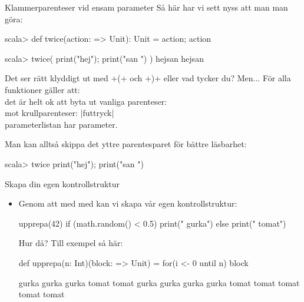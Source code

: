\begin{Slide}{Klammerparenteser vid ensam parameter}
Så här har vi sett nyss att man man göra:
\begin{REPL}
scala> def twice(action: => Unit): Unit = { action; action }

scala> twice( { print("hej"); print("san ") } )
hejsan hejsan
\end{REPL}

Det ser rätt klyddigt ut med \code+{(+  och \code+)}+ eller vad tycker du? \pause Men...
För alla funktioner  gäller att: \\ det är helt ok att byta ut vanliga parenteser: \hfill{} \\ mot krullparenteser: \hfill\code|f{uttryck}| \\  parameterlistan har  parameter.

\vspace{0.5em}Man kan alltså skippa det yttre parentesparet för bättre läsbarhet:
\begin{REPLnonum}
scala> twice { print("hej"); print("san ") }
\end{REPLnonum}
\end{Slide}



\begin{Slide}{Skapa din egen kontrollstruktur}
\begin{itemize}
\item Genom att   med  med  kan vi skapa vår egen kontrollstruktur:  \pause
\begin{Code}
upprepa(42){
  if (math.random() < 0.5) print(" gurka")
  else print(" tomat")
}
\end{Code}
Hur då?
\pause
 Till exempel så här:
\begin{Code}
def upprepa(n: Int)(block: => Unit) = {
  for(i <- 0 until n) {
    block
  }
}


\end{Code}

\pause

\begin{REPLnonum}
gurka gurka gurka tomat tomat gurka gurka gurka gurka tomat tomat tomat tomat tomat
\end{REPLnonum}
\end{itemize}
\end{Slide}



